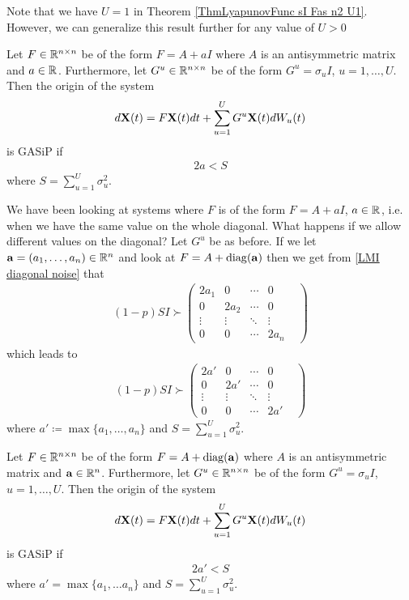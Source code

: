 \documentclass[a4paper,12pt,twoside,BCOR=10mm]{scrbook}
\begin{document}
Note that we have $U = 1$ in Theorem \ref{ThmLyapunovFunc sI Fas n2 U1}. However, we can generalize this result further for any value of $U > 0$

\begin{theorem}
Let $F\in \mathbb{R}^{n\times n}$ be of the form $F = A + aI$ where $A$ is an antisymmetric matrix and $a \in \mathbb{R}^{}$. Furthermore, let $G^u \in \mathbb{R}^{n\times n}$ be of the form $G^u = \sigma_u I$, $u = 1,\ldots, U$. Then the origin of the system
\begin{align*}
    d\mathbf{X}(t) = F\mathbf{X}(t)dt + \sum_{u=1}^U G^u\mathbf{X}(t)dW_u(t)
\end{align*}
is GASiP if
\begin{align*}
    2a < S
\end{align*}
where $S = \sum\limits_{u = 1}^U \sigma_u^2$.
\end{theorem}

We have been looking at systems where $F$ is of the form $F = A + aI$, $a \in \mathbb{R}^{}$, i.e. when we have the same value on the whole diagonal. What happens if we allow different values on the diagonal? Let $G^u$ be as before. If we let $\mathbf{a} = (a_1, \ldots, a_n)\in \mathbb{R}^{n}$ and look at $F = A + \operatorname{diag}(\mathbf{a})$ then we get from \eqref{LMI diagonal noise} that
\begin{align*}
    (1 - p)SI \succ \begin{pmatrix}
    2a_1 & 0 & \cdots & 0\\
    0 & 2a_2 & \cdots & 0\\
    \vdots & \vdots & \ddots & \vdots\\
    0 & 0 & \cdots & 2a_n&
    \end{pmatrix}
\end{align*}
which leads to
\begin{align*}
    (1 - p)SI \succ \begin{pmatrix}
    2a' & 0 & \cdots & 0\\
    0 & 2a' & \cdots & 0\\
    \vdots & \vdots & \ddots & \vdots\\
    0 & 0 & \cdots & 2a'&
    \end{pmatrix}
\end{align*}
where $a' \coloneqq \max\{a_1, \ldots, a_n\}$ and $S = \sum\limits_{u = 1}^U \sigma_u^2$.

\begin{theorem}\label{ThmSpecialCaseAlmennast}
Let $F \in \mathbb{R}^{n\times n}$ be of the form $F = A + \operatorname{diag}(\mathbf{a})$ where $A$ is an antisymmetric matrix and $\mathbf{a}\in\mathbb{R}^{n}$. Furthermore, let $G^u \in \mathbb{R}^{n \times n}$ be of the form $G^u = \sigma_u I$, $u = 1,\ldots, U$. Then the origin of the system
\begin{align*}
    d\mathbf{X}(t) = F\mathbf{X}(t)dt + \sum_{u=1}^U G^u\mathbf{X}(t)dW_u(t)
\end{align*}
is GASiP if
\begin{align*}
    2a' < S
\end{align*}
where $a' = \max\{a_1, \ldots a_n\}$ and $S = \sum\limits_{u = 1}^U \sigma_u^2$.
\end{theorem}
\end{document}
